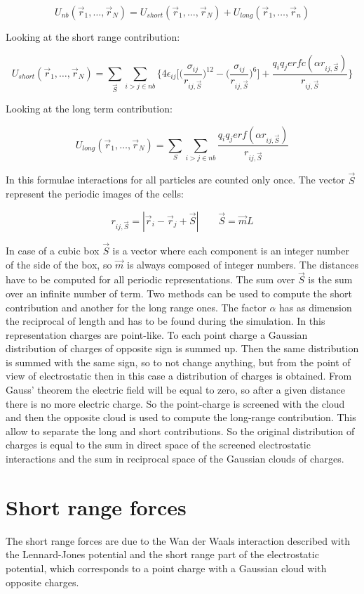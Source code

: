 	$$U_{nb}(\vec{r}_1, \dots, \vec{r}_N) = U_{short}(\vec{r}_1, \dots, \vec{r}_N) + U_{long}(\vec{r}_1, \dots, \vec{r}_n)$$

	Looking at the short range contribution:

	$$U_{short}(\vec{r}_1, \dots, \vec{r}_N) = \sum\limits_{\vec{S}}\sum\limits_{i>j\in nb}\biggl\{4\epsilon_{ij}\biggl[\biggl(\frac{\sigma_{ij}}{r_{ij,\vec{S}}}\biggr)^{12}-\biggl(\frac{\sigma_{ij}}{r_{ij, \vec{S}}}\biggr)^6\biggr] + \frac{q_iq_jerfc(\alpha r_{ij, \vec{S}})}{r_{ij, \vec{S}}}\biggr\}$$

	Looking at the long term contribution:

	$$U_{long}(\vec{r}_1, \dots, \vec{r}_N) = \sum\limits_S\sum\limits_{i>j\in nb} \frac{q_iq_j erf(\alpha r_{ij, \vec{S}})}{r_{ij, \vec{S}}}$$

	In this formulae interactions for all particles are counted only once.
	The vector $\vec{S}$ represent the periodic images of the cells:

	$$r_{ij, \vec{S}} = |\vec{r}_i-\vec{r}_j + \vec{S}|\qquad \vec{S} = \vec{m}L$$

	In case of a cubic box $\vec{S}$ is a vector where each component is an integer number of the side of the box, so $\vec{m}$ is always composed of integer numbers.
	The distances have to be computed for all periodic representations.
	The sum over $\vec{S}$ is the sum over an infinite number of term.
	Two methods can be used to compute the short contribution and another for the long range ones.
	The factor $\alpha$ has as dimension the reciprocal of length and has to be found during the simulation.
	In this representation charges are point-like.
	To each point charge a Gaussian distribution of charges of opposite sign is summed up.
	Then the same distribution is summed with the same sign, so to not change anything, but from the point of view of electrostatic then in this case a distribution of charges is obtained.
	From Gauss' theorem the electric field will be equal to zero, so after a given distance there is no more electric charge.
	So the point-charge is screened with the cloud and then the opposite cloud is used to compute the long-range contribution.
	This allow to separate the long and short contributions.
	So the original distribution of charges is equal to the sum in direct space of the screened electrostatic interactions and the sum in reciprocal space of the Gaussian clouds of charges.

\section{Short range forces}
The short range forces are due to the Wan der Waals interaction described with the Lennard-Jones potential and the short range part of the electrostatic potential, which corresponds to a point charge with a Gaussian cloud with opposite charges.

